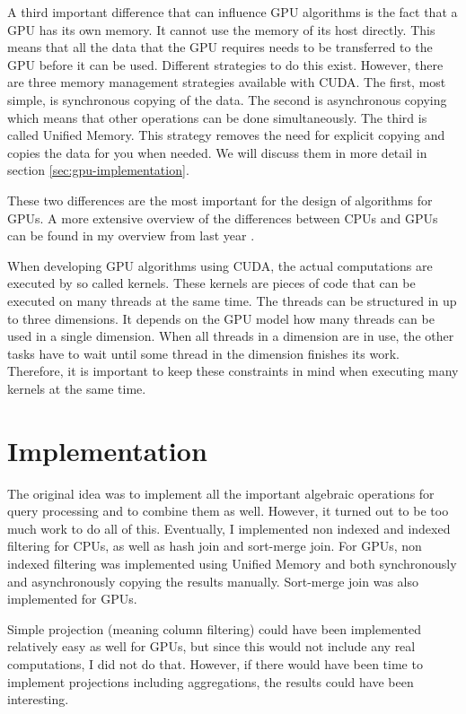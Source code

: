 \documentclass[a4paper,titlepage]{article}
\begin{document}
A third important difference that can influence GPU algorithms is the fact that a GPU has its own memory. It cannot use the memory of its host directly. This means that all the data that the GPU requires needs to be transferred to the GPU before it can be used. Different strategies to do this exist. However, there are three memory management strategies available with CUDA. The first, most simple, is synchronous copying of the data. The second is asynchronous copying which means that other operations can be done simultaneously. The third is called Unified Memory. This strategy removes the need for explicit copying and copies the data for you when needed. We will discuss them in more detail in section \ref{sec:gpu-implementation}.

These two differences are the most important for the design of algorithms for GPUs. A more extensive overview of the differences between CPUs and GPUs can be found in my overview from last year \cite{kostjens2015}.

When developing GPU algorithms using CUDA, the actual computations are executed by so called kernels. These kernels are pieces of code that can be executed on many threads at the same time. The threads can be structured in up to three dimensions. It depends on the GPU model how many threads can be used in a single dimension. When all threads in a dimension are in use, the other tasks have to wait until some thread in the dimension finishes its work. Therefore, it is important to keep these constraints in mind when executing many kernels at the same time.

\section{Implementation}
\label{sec:implementation}
The original idea was to implement all the important algebraic operations for query processing and to combine them as well. However, it turned out to be too much work to do all of this. Eventually, I implemented non indexed and indexed filtering for CPUs, as well as hash join and sort-merge join. For GPUs, non indexed filtering was implemented using Unified Memory and both synchronously and asynchronously copying the results manually. Sort-merge join was also implemented for GPUs.

Simple projection (meaning column filtering) could have been implemented relatively easy as well for GPUs, but since this would not include any real computations, I did not do that. However, if there would have been time to implement projections including aggregations, the results could have been interesting.
\end{document}
